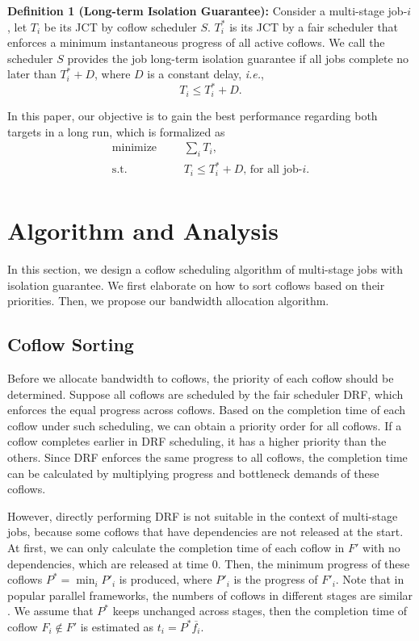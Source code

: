 \documentclass[10pt,journal,compsoc]{IEEEtran}
\begin{document}
\textbf{Definition 1 (Long-term Isolation Guarantee):} Consider a multi-stage job-$i$, let $T_i$ be its JCT by coflow scheduler $S$.
%
$T_i^*$ is its JCT by a fair scheduler that enforces a minimum instantaneous progress of all active coflows.
%
We call the scheduler $S$ provides the job long-term isolation guarantee if all jobs complete no later than $T_i^* + D$, where $D$ is a constant delay, \emph{i.e.},
%
\begin{equation}
	T_i \leq T_i^* + D.
\end{equation}

In this paper, our objective is to gain the best performance regarding both targets in a long run, which is formalized as
\begin{equation}
	\begin{aligned}
		\text{minimize} & & &\sum\limits_{i}T_i,\\
		\text{s.t.} & & &T_i \leq T_i^* + D \text{, for all job-}i.\\
	\end{aligned}
\end{equation}

\section{Algorithm and Analysis}\label{algorithm}
In this section, we design a coflow scheduling algorithm of multi-stage jobs with isolation guarantee.
%
We first elaborate on how to sort coflows based on their priorities.
%
Then, we propose our bandwidth allocation algorithm.

\subsection{Coflow Sorting}
Before we allocate bandwidth to coflows, the priority of each coflow should be determined.
%
Suppose all coflows are scheduled by the fair scheduler DRF, which enforces the equal progress across coflows\cite{DRF,HUG}.
%
Based on the completion time of each coflow under such scheduling, we can obtain a priority order for all coflows.
%
If a coflow completes earlier in DRF scheduling, it has a higher priority than the others.
%
Since DRF enforces the same progress to all coflows, the completion time can be calculated by multiplying progress and bottleneck demands of these coflows.

However, directly performing DRF is not suitable in the context of multi-stage jobs, because some coflows that have dependencies are not released at the start.
%
At first, we can only calculate the completion time of each coflow in $F'$ with no dependencies, which are released at time 0.
%
Then, the minimum progress of these coflows $P^* = \min_iP'_i$ is produced, where $P'_i$ is the progress of $F'_i$.
%
Note that in popular parallel frameworks, the numbers of coflows in different stages are similar \cite{Spark,coflowsurvey}.
%
We assume that $P^*$ keeps unchanged across stages, then the completion time of coflow $F_i \notin F'$ is estimated as $t_i = P^*\overline{f_i}$.
\end{document}
